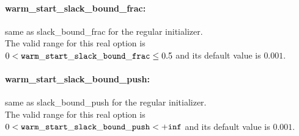 \paragraph{warm\_start\_slack\_bound\_frac:}\label{sec:warm_start_slack_bound_frac} same as slack\_bound\_frac for the regular initializer. $\;$ \\
 The valid range for this real option is 
$0 <  {\tt warm\_start\_slack\_bound\_frac } \le 0.5$
and its default value is $0.001$.


\paragraph{warm\_start\_slack\_bound\_push:}\label{sec:warm_start_slack_bound_push} same as slack\_bound\_push for the regular initializer. $\;$ \\
 The valid range for this real option is 
$0 <  {\tt warm\_start\_slack\_bound\_push } <  {\tt +inf}$
and its default value is $0.001$.

